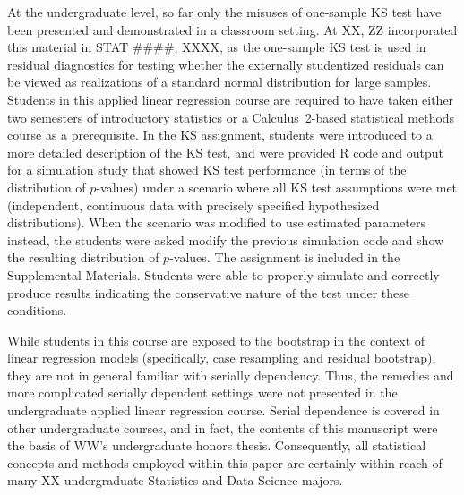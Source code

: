 \documentclass[12pt, letterpaper]{article}
\begin{document}
{%
At the undergraduate level, so far only the misuses of one-sample KS test have 
been presented and demonstrated in a classroom setting. At XX, ZZ 
incorporated this material in STAT $\#\#\#\#$, XXXX, as the one-sample KS test 
is used in residual diagnostics for testing 
whether the externally studentized residuals can be viewed as realizations of a 
standard normal distribution for large samples. %
Students in this applied linear regression course are required
to have taken either two semesters of introductory statistics or a 
Calculus~2-based statistical methods course as a prerequisite. In the KS 
assignment, students were introduced to a more detailed description of the KS 
test, and were provided R code and output for a simulation study that showed  
KS test performance (in terms of the distribution of $p$-values) under a 
scenario where all KS test assumptions were met (independent, continuous data 
with precisely specified hypothesized distributions). When the scenario was 
modified to use estimated parameters instead, the students were asked modify the 
previous simulation code and show the resulting distribution of $p$-values. The 
assignment is included in the Supplemental Materials. Students were able to
properly simulate and correctly produce results indicating the conservative 
nature of the test under these conditions. 

While students in this course are exposed to the bootstrap in the 
context of linear regression models (specifically, case resampling and residual 
bootstrap), they are not in general familiar with serially dependency. Thus, the 
remedies and more complicated serially dependent settings were not presented in 
the undergraduate applied linear regression course. Serial dependence is covered 
in other undergraduate courses, and in fact, the contents of this manuscript 
were the basis of WW's undergraduate honors thesis. Consequently, all 
statistical concepts and methods employed within this paper are certainly within 
reach of many XX undergraduate Statistics and Data Science majors. 
} \fi
    
\end{document}
